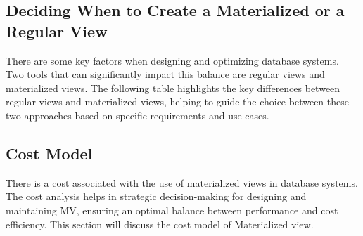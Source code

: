 \subsection{Deciding When to Create a Materialized or a Regular View}There are some key factors when designing and optimizing database systems. Two tools that can significantly impact this balance are regular views and materialized views. The following table highlights the key differences between regular views and materialized views, helping to guide the choice between these two approaches based on specific requirements and use cases.\vspace{.4cm}




 \subsection{Cost Model}
 There is a cost associated with the use of materialized views in database systems. The cost analysis helps in strategic decision-making for designing and maintaining MV, ensuring an optimal balance between performance and cost efficiency. This section will discuss the cost model of Materialized view.\vspace{.4cm}

